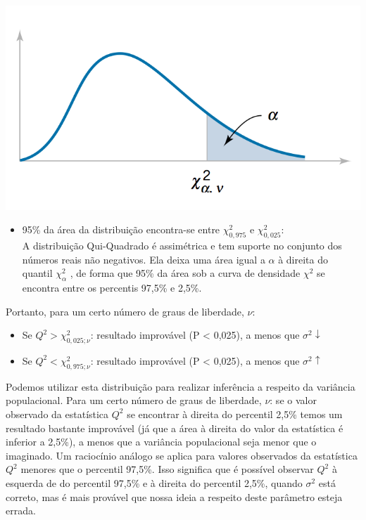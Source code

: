 \documentclass[
]{book}
\providecommand{\tightlist}{%
  \setlength{\itemsep}{0pt}\setlength{\parskip}{0pt}}
\theoremstyle{definition}
\theoremstyle{definition}
\theoremstyle{definition}
\theoremstyle{remark}
\begin{document}
\begin{center}\includegraphics[width=0.5\linewidth]{img/distr-chi2} \end{center}

\begin{itemize}
\tightlist
\item
  95\% da área da distribuição encontra-se entre \(\chi^2_{0,975}\) e \(\chi^2_{0,025}\):\\
  A distribuição Qui-Quadrado é assimétrica e tem suporte no conjunto dos números reais não negativos. Ela deixa uma área igual a \(\alpha\) à direita do quantil \(\chi^2_\alpha\) , de forma que 95\% da área sob a curva de densidade \(\chi^2\) se encontra entre os percentis 97,5\% e 2,5\%.
\end{itemize}

Portanto, para um certo número de graus de liberdade, \(\nu\):

\begin{itemize}
\tightlist
\item
  Se \(Q^2 > \chi^2_{0,025; \nu}\): resultado improvável (P \textless{} 0,025), a menos que \(\sigma^2 \downarrow\)\\
\item
  Se \(Q^2 < \chi^2_{0,975; \nu}\): resultado improvável (P \textless{} 0,025), a menos que \(\sigma^2 \uparrow\)
\end{itemize}

Podemos utilizar esta distribuição para realizar inferência a respeito da variância populacional. Para um certo número de graus de liberdade, \(\nu\): se o valor observado da estatística \(Q^2\) se encontrar à direita do percentil 2,5\% temos um resultado bastante improvável (já que a área à direita do valor da estatística é inferior a 2,5\%), a menos que a variância populacional seja menor que o imaginado. Um raciocínio análogo se aplica para valores observados da estatística \(Q^2\) menores que o percentil 97,5\%. Isso significa que é possível observar \(Q^2\) à esquerda de do percentil 97,5\% e à direita do percentil 2,5\%, quando \(\sigma^2\) está correto, mas é mais provável que nossa ideia a respeito deste parâmetro esteja errada.
\end{document}
